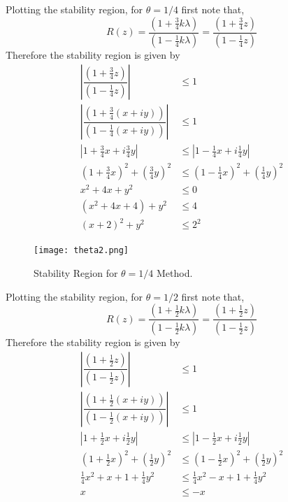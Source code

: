 \documentclass[12pt]{article}
\makeatletter
\theoremstyle{homework}
\newenvironment{exercise}[1]
{\def\@currentlabel{#1}\exercisecore}
{\endexercisecore}
\makeatother
\begin{document}
\begin{exercise}{Problem P30}
\begin{enumerate}
    Plotting the stability region, for $\theta = 1/4$ first note that,
    \begin{equation*}
      R(z) = \dfrac{(1 + \frac{3}{4}k\lambda)}{ (1 - \frac{1}{4} k\lambda) } = \dfrac{(1 + \frac{3}{4}z)}{ (1 - \frac{1}{4} z) }
    \end{equation*}
    Therefore the stability region is given by 
    \begin{align*}
      \left|\dfrac{(1 + \frac{3}{4}z)}{ (1 - \frac{1}{4} z) }\right| &\leq 1\\
      \left|\dfrac{(1 + \frac{3}{4}(x + iy))}{ (1 - \frac{1}{4}(x + iy)) }\right| &\leq 1\\
      \left|1 + \frac{3}{4}x + i\frac{3}{4}y\right| &\leq \left|1 - \frac{1}{4}x + i\frac{1}{4}y\right|\\
      (1 + \frac{3}{4}x)^2 + (\frac{3}{4}y)^2 &\leq (1 - \frac{1}{4}x)^2 + (\frac{1}{4}y)^2\\
      x^2 + 4x + y^2 &\leq 0\\
      (x^2 + 4x + 4) + y^2 &\leq 4\\
      (x + 2)^2 + y^2 &\leq 2^2
    \end{align*}

  \begin{figure}[H]
   \begin{center}
     \caption{Stability Region for $\theta = 1/4$ Method.}
     \texttt{[image: theta2.png]}
   \end{center}
  \end{figure}



    Plotting the stability region, for $\theta = 1/2$ first note that,
    \begin{equation*}
      R(z) = \dfrac{(1 + \frac{1}{2}k\lambda)}{ (1 - \frac{1}{2} k\lambda) } = \dfrac{(1 + \frac{1}{2}z)}{ (1 - \frac{1}{2}z) }
    \end{equation*}
    Therefore the stability region is given by 
    \begin{align*}
      \left|\dfrac{(1 + \frac{1}{2}z)}{ (1 - \frac{1}{2} z) }\right| &\leq 1\\
      \left|\dfrac{(1 + \frac{1}{2}(x + iy))}{ (1 - \frac{1}{2}(x + iy)) }\right| &\leq 1\\
      \left|1 + \frac{1}{2}x + i\frac{1}{2}y\right| &\leq \left|1 - \frac{1}{2}x + i\frac{1}{2}y\right|\\
      (1 + \frac{1}{2}x)^2 + (\frac{1}{2}y)^2 &\leq (1 - \frac{1}{2}x)^2 + (\frac{1}{2}y)^2\\
      \frac{1}{4}x^2 + x + 1 + \frac{1}{4}y^2 &\leq \frac{1}{4}x^2 - x + 1 + \frac{1}{4}y^2\\
      x&\leq -x
    \end{align*}


\end{enumerate}
\end{exercise}
\end{document}
